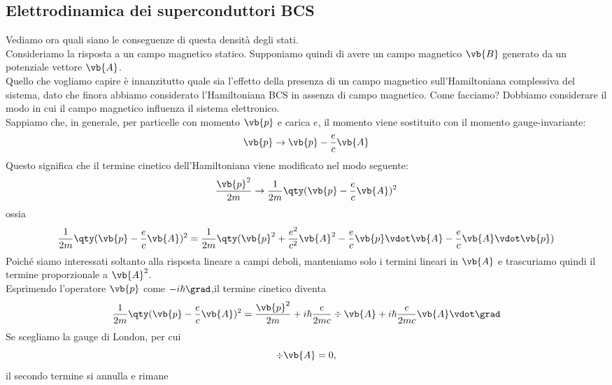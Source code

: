 \subsection{Elettrodinamica dei superconduttori BCS}
Vediamo ora quali siano le conseguenze di questa densità degli stati.\\
Consideriamo la risposta a un campo magnetico statico. Supponiamo quindi di avere un campo magnetico $\vb{B}$ generato da un potenziale vettore $\vb{A}$.\\
Quello che vogliamo capire è innanzitutto quale sia l'effetto della presenza di un campo magnetico sull'Hamiltoniana complessiva del sistema, dato che finora abbiamo considerato l'Hamiltoniana BCS in assenza di campo magnetico. Come facciamo? Dobbiamo considerare il modo in cui il campo magnetico influenza il sistema elettronico.\\
Sappiamo che, in generale, per particelle con momento $\vb{p}$ e carica $e$, il momento viene sostituito con il momento gauge-invariante:
\begin{equation*}
   \vb{p}
   \to
   \vb{p}
   -
   \frac{e}{c}\vb{A}
\end{equation*}
Questo significa che il termine cinetico dell'Hamiltoniana viene modificato nel modo seguente:
\begin{equation*}
   \frac{\vb{p}^2}{2m}
   \to
   \frac{1}{2m}
   \qty(
      \vb{p}
      -
      \frac{e}{c}\vb{A}
   )^2
\end{equation*}
ossia
\begin{equation*}
   \frac{1}{2m}
   \qty(
      \vb{p}
      -
      \frac{e}{c}\vb{A}
   )^2
   =
   \frac{1}{2m}
   \qty(
      \vb{p}^2
      +
      \frac{e^2}{c^2}\vb{A}^2
      -
      \frac{e}{c}\vb{p}\vdot\vb{A}
      -
      \frac{e}{c}\vb{A}\vdot\vb{p}
   )
\end{equation*}
Poiché siamo interessati soltanto alla risposta lineare a campi deboli, manteniamo solo i termini lineari in $\vb{A}$ e trascuriamo quindi il termine proporzionale a $\vb{A}^2$.\\
Esprimendo l'operatore $\vb{p}$ come $-i\hbar\grad$,il termine cinetico diventa
\begin{equation*}
   \frac{1}{2m}
   \qty(
      \vb{p}
      -
      \frac{e}{c}\vb{A}
   )^2
   =
   \frac{\vb{p}^2}{2m}
   +
   i\hbar\frac{e}{2mc}\div{\vb{A}}
   +
   i\hbar\frac{e}{2mc}\vb{A}\vdot\grad
\end{equation*}
Se scegliamo la gauge di London, per cui
\[
\div{\vb{A}}=0,
\]
il secondo termine si annulla e rimane
